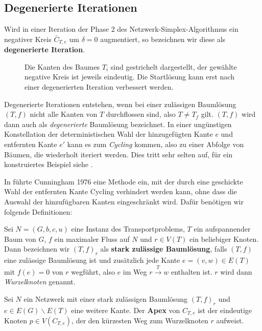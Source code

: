 \subsection{Degenerierte Iterationen}\label{ch:deg}

\begin{defn}Wird in einer Iteration der Phase 2 des Netzwerk-Simplex-Algorithmus ein negativer Kreis $\bar{C}_{T,e}$ um $\delta=0$ augmentiert, so bezeichnen wir diese als \textbf{degenerierte Iteration}.
\end{defn}

\begin{figure}[!ht]\centering
	
	\caption{Die Kanten des Baumes $T_i$ sind gestrichelt dargestellt, der gewählte negative Kreis ist jeweils eindeutig. Die Startlösung kann erst nach einer degenerierten Iteration verbessert werden.}
	\label{fig:deg}
\end{figure}

Degenerierte Iterationen entstehen, wenn bei einer zulässigen Baumlösung $(T,f)$ nicht alle Kanten von $T$ durchflossen sind, also $T\neq T_f$ gilt. $(T,f)$ wird dann auch als \emph{degenerierte} Baumlösung bezeichnet. In einer ungünstigen Konstellation der deterministischen Wahl der hinzugefügten Kante $e$ und entfernten Kante $e'$ kann es zum \emph{Cycling} kommen, also zu einer Abfolge von Bäumen, die wiederholt iteriert werden. Dies tritt sehr selten auf, für ein konstruiertes Beispiel siehe \cite[S. 303]{NSAbook}.

In \cite{cycling} führte Cunningham 1976 eine Methode ein, mit der durch eine geschickte Wahl der entfernten Kante Cycling verhindert werden kann, ohne dass die Auswahl der hinzufügbaren Kanten eingeschränkt wird. Dafür benötigen wir folgende Definitionen:

\begin{defn}Sei $N=(G,b,c,u)$ eine Instanz des Transportproblems, $T$ ein aufspannender Baum von $G$, $f$ ein maximaler Fluss auf $N$ und $r\in V(T)$ ein beliebiger Knoten. Dann bezeichnen wir $(T,f)_r$ als \textbf{stark zulässige Baumlösung}, falls $(T,f)$ eine zulässige Baumlösung ist und zusätzlich jede Kante $e=(v,w)\in E(T)$ mit $f(e)=0$ von $r$ wegführt, also $e$ im Weg $r\xrightarrow{T}w$ enthalten ist. $r$ wird dann \emph{Wurzelknoten} genannt.\end{defn}

\begin{defn}Sei $N$ ein Netzwerk mit einer stark zulässigen Baumlösung $(T,f)_r$ und $e\in E(G)\backslash E(T)$ eine weitere Kante. Der \textbf{Apex} von $C_{T,e}$ ist der eindeutige Knoten $p\in V(C_{T,e})$, der den kürzesten Weg zum Wurzelknoten $r$ aufweist.\end{defn}

